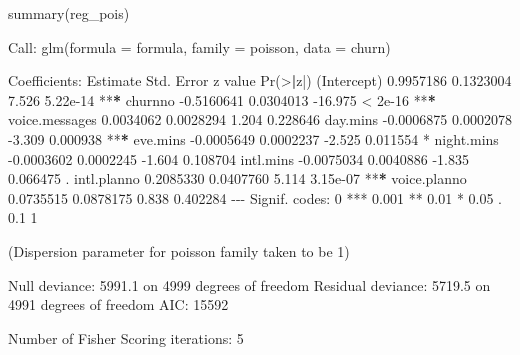 \documentclass[
  11pt,
]{book}
\makeatletter
\newenvironment{Shaded}{}{}
\newcommand{\AttributeTok}[1]{#1}
\newcommand{\ControlFlowTok}[1]{\textcolor[rgb]{0.07,0.07,0.07}{#1}}
\newcommand{\DecValTok}[1]{#1}
\newcommand{\ErrorTok}[1]{\textcolor[rgb]{0.21,0.21,0.21}{\textbf{#1}}}
\newcommand{\FloatTok}[1]{#1}
\newcommand{\FunctionTok}[1]{#1}
\newcommand{\NormalTok}[1]{#1}
\newcommand{\SpecialCharTok}[1]{\textcolor[rgb]{0.39,0.39,0.39}{#1}}
\newcommand{\StringTok}[1]{\textcolor[rgb]{0.39,0.39,0.39}{#1}}
\newenvironment{kframe}{%
\medskip{}
\setlength{\fboxsep}{.8em}
 \def\at@end@of@kframe{}%
 \ifinner\ifhmode%
  \def\at@end@of@kframe{\end{minipage}}%
  \begin{minipage}{\columnwidth}%
 \fi\fi%
 \def\FrameCommand##1{\hskip\@totalleftmargin \hskip-\fboxsep
 \colorbox{shadecolor}{##1}\hskip-\fboxsep
     \hskip-\linewidth \hskip-\@totalleftmargin \hskip\columnwidth}%
 \MakeFramed {\advance\hsize-\width
   \@totalleftmargin\z@ \linewidth\hsize
   \@setminipage}}%
 {\par\unskip\endMakeFramed%
 \at@end@of@kframe}
\renewenvironment{Shaded}{\begin{kframe}}{\end{kframe}}
\theoremstyle{definition}
\theoremstyle{definition}
\theoremstyle{definition}
\theoremstyle{definition}
\theoremstyle{remark}
\makeatother
\begin{document}
\begin{Shaded}
\begin{Highlighting}[]
\FunctionTok{summary}\NormalTok{(reg\_pois)}
   
\NormalTok{   Call}\SpecialCharTok{:}
   \FunctionTok{glm}\NormalTok{(}\AttributeTok{formula =}\NormalTok{ formula, }\AttributeTok{family =}\NormalTok{ poisson, }\AttributeTok{data =}\NormalTok{ churn)}
   
\NormalTok{   Coefficients}\SpecialCharTok{:}
\NormalTok{                    Estimate Std. Error z value }\FunctionTok{Pr}\NormalTok{(}\SpecialCharTok{\textgreater{}}\ErrorTok{|}\NormalTok{z}\SpecialCharTok{|}\NormalTok{)    }
\NormalTok{   (Intercept)     }\FloatTok{0.9957186}  \FloatTok{0.1323004}   \FloatTok{7.526} \FloatTok{5.22e{-}14} \SpecialCharTok{**}\ErrorTok{*}
\NormalTok{   churnno        }\SpecialCharTok{{-}}\FloatTok{0.5160641}  \FloatTok{0.0304013} \SpecialCharTok{{-}}\FloatTok{16.975}  \SpecialCharTok{\textless{}} \FloatTok{2e{-}16} \SpecialCharTok{**}\ErrorTok{*}
\NormalTok{   voice.messages  }\FloatTok{0.0034062}  \FloatTok{0.0028294}   \FloatTok{1.204} \FloatTok{0.228646}    
\NormalTok{   day.mins       }\SpecialCharTok{{-}}\FloatTok{0.0006875}  \FloatTok{0.0002078}  \SpecialCharTok{{-}}\FloatTok{3.309} \FloatTok{0.000938} \SpecialCharTok{**}\ErrorTok{*}
\NormalTok{   eve.mins       }\SpecialCharTok{{-}}\FloatTok{0.0005649}  \FloatTok{0.0002237}  \SpecialCharTok{{-}}\FloatTok{2.525} \FloatTok{0.011554} \SpecialCharTok{*}  
\NormalTok{   night.mins     }\SpecialCharTok{{-}}\FloatTok{0.0003602}  \FloatTok{0.0002245}  \SpecialCharTok{{-}}\FloatTok{1.604} \FloatTok{0.108704}    
\NormalTok{   intl.mins      }\SpecialCharTok{{-}}\FloatTok{0.0075034}  \FloatTok{0.0040886}  \SpecialCharTok{{-}}\FloatTok{1.835} \FloatTok{0.066475}\NormalTok{ .  }
\NormalTok{   intl.planno     }\FloatTok{0.2085330}  \FloatTok{0.0407760}   \FloatTok{5.114} \FloatTok{3.15e{-}07} \SpecialCharTok{**}\ErrorTok{*}
\NormalTok{   voice.planno    }\FloatTok{0.0735515}  \FloatTok{0.0878175}   \FloatTok{0.838} \FloatTok{0.402284}    
   \SpecialCharTok{{-}{-}{-}}
\NormalTok{   Signif. codes}\SpecialCharTok{:}  \DecValTok{0} \StringTok{\textquotesingle{}***\textquotesingle{}} \FloatTok{0.001} \StringTok{\textquotesingle{}**\textquotesingle{}} \FloatTok{0.01} \StringTok{\textquotesingle{}*\textquotesingle{}} \FloatTok{0.05} \StringTok{\textquotesingle{}.\textquotesingle{}} \FloatTok{0.1} \StringTok{\textquotesingle{} \textquotesingle{}} \DecValTok{1}
   
\NormalTok{   (Dispersion parameter }\ControlFlowTok{for}\NormalTok{ poisson family taken to be }\DecValTok{1}\NormalTok{)}
   
\NormalTok{       Null deviance}\SpecialCharTok{:} \FloatTok{5991.1}\NormalTok{  on }\DecValTok{4999}\NormalTok{  degrees of freedom}
\NormalTok{   Residual deviance}\SpecialCharTok{:} \FloatTok{5719.5}\NormalTok{  on }\DecValTok{4991}\NormalTok{  degrees of freedom}
\NormalTok{   AIC}\SpecialCharTok{:} \DecValTok{15592}
   
\NormalTok{   Number of Fisher Scoring iterations}\SpecialCharTok{:} \DecValTok{5}
\end{Highlighting}
\end{Shaded}
\end{document}
